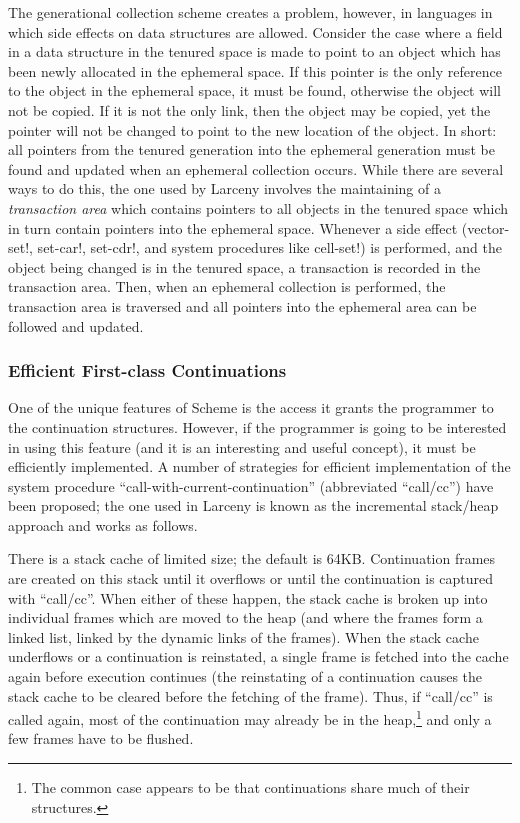 The generational collection scheme creates a problem, however, in
languages in which side effects on data structures are allowed.
Consider the case where a field in a data structure in the tenured
space is made to point to an object which has been newly allocated in
the ephemeral space. If this pointer is the only reference to the
object in the ephemeral space, it must be found, otherwise the object
will not be copied. If it is not the only link, then the object may be
copied, yet the pointer will not be changed to point to the new
location of the object. In short: all pointers from the tenured
generation into the ephemeral generation must be found and updated
when an ephemeral collection occurs. While there are several ways to
do this, the one used by Larceny involves the maintaining of a
{\em transaction area} which contains pointers to all objects in the
tenured space which in turn contain pointers into the ephemeral space.
Whenever a side effect (vector-set!, set-car!, set-cdr!, and system
procedures like cell-set!) is performed, and the object being changed
is in the tenured space, a transaction is recorded in the transaction
area. Then, when an ephemeral collection is performed, the transaction
area is traversed and all pointers into the ephemeral area can be followed
and updated.

\subsubsection{Efficient First-class Continuations}

One of the unique features of Scheme is the access it grants the
programmer to the continuation structures. However, if the programmer
is going to be interested in using this feature (and it is an
interesting and useful concept), it must be efficiently implemented.
A number of strategies for efficient implementation of the system
procedure ``call-with-current-continuation'' (abbreviated ``call/cc'')
have been proposed; the one used in Larceny is known as the incremental
stack/heap approach and works as follows.

There is a stack cache of limited size; the default is 64KB.
Continuation frames are created on this stack until it overflows or
until the continuation is captured with ``call/cc''. When either of
these happen, the stack cache is broken up into individual frames
which are moved to the heap (and where the frames form a linked list,
linked by the dynamic links of the frames). When the stack cache
underflows or a continuation is reinstated, a single frame is fetched
into the cache again before execution continues (the reinstating of a
continuation causes the stack cache to be cleared before the fetching
of the frame). Thus, if ``call/cc'' is called again, most of the
continuation may already be in the heap,\footnote{The common case
appears to be that continuations share much of their structures.} and
only a few frames have to be flushed.

